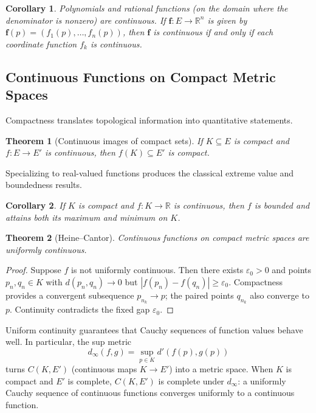 \documentclass{article}
\theoremstyle{definition}
\theoremstyle{plain}
\newtheorem{theorem}{Theorem}[section]
\newtheorem{corollary}{Corollary}[theorem]
\begin{document}
\begin{corollary}
	Polynomials and rational functions (on the domain where the denominator is nonzero) are continuous. If $\mathbf{f}\colon E\to \mathbb{R}^n$ is given by $\mathbf{f}(p)=(f_1(p),\dots,f_n(p))$, then $\mathbf{f}$ is continuous if and only if each coordinate function $f_k$ is continuous.
\end{corollary}

\subsection{Continuous Functions on Compact Metric Spaces}\label{subsec:cont-compact}
Compactness translates topological information into quantitative statements.
\begin{theorem}[Continuous images of compact sets]\label{thm:cont-image-compact}
	If $K\subseteq E$ is compact and $f\colon E\to E'$ is continuous, then $f(K)\subseteq E'$ is compact.
\end{theorem}

Specializing to real-valued functions produces the classical extreme value and boundedness results.
\begin{corollary}\label{cor:bounded-max-min}
	If $K$ is compact and $f\colon K\to \mathbb{R}$ is continuous, then $f$ is bounded and attains both its maximum and minimum on $K$.
\end{corollary}

\begin{theorem}[Heine--Cantor]\label{thm:uniform-continuity}
	Continuous functions on compact metric spaces are uniformly continuous.
\end{theorem}
\begin{proof}
	Suppose $f$ is not uniformly continuous. Then there exists $\varepsilon_0>0$ and points $p_n,q_n\in K$ with $d(p_n,q_n)\to 0$ but $|f(p_n)-f(q_n)|\ge \varepsilon_0$. Compactness provides a convergent subsequence $p_{n_k}\to p$; the paired points $q_{n_k}$ also converge to $p$. Continuity contradicts the fixed gap $\varepsilon_0$.
\end{proof}

Uniform continuity guarantees that Cauchy sequences of function values behave well. In particular, the sup metric
\[
	d_\infty(f,g) = \sup_{p\in K} d'(f(p),g(p))
\]
turns $C(K,E')$ (continuous maps $K\to E'$) into a metric space. When $K$ is compact and $E'$ is complete, $C(K,E')$ is complete under $d_\infty$: a uniformly Cauchy sequence of continuous functions converges uniformly to a continuous function.
\end{document}
